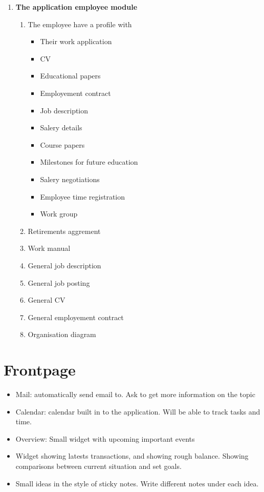 \begin{enumerate}
\begin{enumerate}
\begin{enumerate}
            \item \textbf{The application employee module}
            \begin{enumerate}
                \item The employee have a profile with
                \begin{itemize}
                    \item Their work application
                    \item CV
                    \item Educational papers
                    \item Employement contract
                    \item Job description
                    \item Salery details
                    \item Course papers
                    \item Milestones for future education
                    \item Salery negotiations
                    \item Employee time registration
                    \item Work group
                \end{itemize}
                \item Retirements aggrement
                \item Work manual
                \item General job description
                \item General job posting
                \item General CV
                \item General employement contract
                \item Organisation diagram
            \end{enumerate}
        \end{enumerate}
    \end{enumerate}
\end{enumerate}

\section{Frontpage}
\begin{itemize}
	\item Mail: automatically send email to. Ask to get more information on the topic
	\item Calendar: calendar built in to the application. Will be able to track tasks and time.
	\item Overview: Small widget with upcoming important events
	\item Widget showing latests transactions, and showing rough balance. Showing comparisons between current situation and set goals.
	\item Small ideas in the style of sticky notes. Write different notes under each idea.
\end{itemize}

